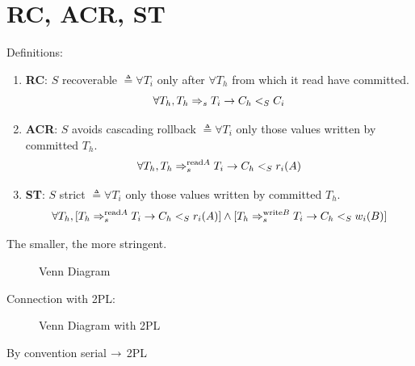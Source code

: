 \documentclass[a4paper]{report}
\begin{document}
\section{RC, ACR, ST}
Definitions:
\begin{enumerate}
\item \textbf{RC}: $S$ recoverable $\triangleq \forall T_i$  only after $\forall T_h$ from which it read have committed.
$$
\forall T_h, T_h \Rightarrow_s T_i \rightarrow C_h <_S C_i
$$
\item \textbf{ACR}: $S$ avoids cascading rollback $\triangleq \forall T_i$  only those values written by committed $T_h$.
$$
\forall T_h, T_h \Rightarrow_s^{\text{read} A} T_i \rightarrow C_h <_S r_i (A)
$$
\item \textbf{ST}: $S$ strict $\triangleq \forall T_i$  only those values written by committed $T_h$.
$$
\forall T_h, [T_h \Rightarrow_s^{\text{read} A} T_i \rightarrow C_h <_S r_i(A)] \wedge[T_h \Rightarrow_s^{\text{write} B} T_i \rightarrow C_h <_S w_i(B)]
$$
\end{enumerate}

The smaller, the more stringent.

\begin{figure}[H]
\centering
{}
\caption{Venn Diagram}
\label{fig:FRCCDiagram}
\end{figure}
Connection with 2PL:
\begin{figure}[H]
\centering
{}
\caption{Venn Diagram with 2PL}
\label{fig:FRCCDiagram}
\end{figure}
By convention serial $\rightarrow$ 2PL
\end{document}

